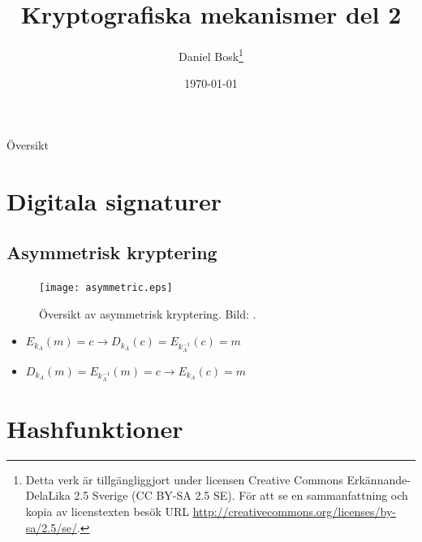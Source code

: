 \documentclass{beamer}
\title{%
  Kryptografiska mekanismer del 2
}
\author{Daniel Bosk\footnote{%
  Detta verk är tillgängliggjort under licensen Creative Commons 
  Erkännande-DelaLika 2.5 Sverige (CC BY-SA 2.5 SE).
	För att se en sammanfattning och kopia av licenstexten besök URL 
	\url{http://creativecommons.org/licenses/by-sa/2.5/se/}.
}}
\institute[MIUN IKS]{%
  Avdelningen för informations- och kommunikationssytem,\\
  Mittuniversitetet, SE-851\,70 Sundsvall.
}
\date{\today}
\theoremstyle{definition}
\begin{document}
\begin{frame}
  \titlepage
\end{frame}

\begin{frame}{Översikt}
  \tableofcontents
\end{frame}





\section{Digitala signaturer}

\subsection{Asymmetrisk kryptering}
\begin{frame}{\insertsubsectionhead}
  \begin{figure}
    \texttt{[image: asymmetric.eps]}
    \caption{Översikt av asymmetrisk kryptering.
    Bild: \cite{Stallings2011can}.}
  \end{figure}
\end{frame}
\begin{frame}{\insertsubsectionhead}
  \begin{itemize}
    \item \(E_{k_A}(m) = c\longrightarrow D_{k_A}(c) = E_{k_A^{-1}}(c) = m\)
    \item \(D_{k_A}(m) = E_{k_A^{-1}}(m) = c\longrightarrow E_{k_A}(c) = m\)
  \end{itemize}
\end{frame}


\section{Hashfunktioner}
\end{document}
